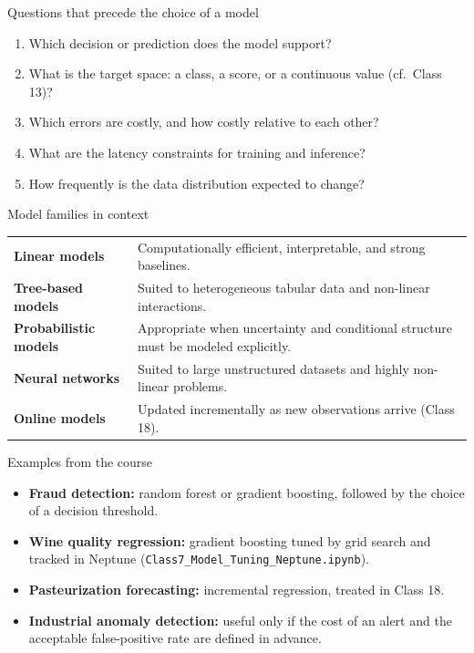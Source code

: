 \begin{frame}{Questions that precede the choice of a model}
\begin{enumerate}
\item Which decision or prediction does the model support?
\item What is the target space: a class, a score, or a continuous value (cf.\ Class 13)?
\item Which errors are costly, and how costly relative to each other?
\item What are the latency constraints for training and inference?
\item How frequently is the data distribution expected to change?
\end{enumerate}
\coursefooter
\end{frame}

\begin{frame}{Model families in context}
\begin{tabularx}{\textwidth}{>{\bfseries}l X}
Linear models & Computationally efficient, interpretable, and strong baselines. \\
\addlinespace[0.3em]
Tree-based models & Suited to heterogeneous tabular data and non-linear interactions. \\
\addlinespace[0.3em]
Probabilistic models & Appropriate when uncertainty and conditional structure must be modeled explicitly. \\
\addlinespace[0.3em]
Neural networks & Suited to large unstructured datasets and highly non-linear problems. \\
\addlinespace[0.3em]
Online models & Updated incrementally as new observations arrive (Class 18). \\
\bottomrule
\end{tabularx}
\coursefooter
\end{frame}

\begin{frame}{Examples from the course}
\begin{itemize}
\item \textbf{Fraud detection:} random forest or gradient boosting, followed by the choice of a decision threshold.
\item \textbf{Wine quality regression:} gradient boosting tuned by grid search and tracked in Neptune (\texttt{Class7\_Model\_Tuning\_Neptune.ipynb}).
\item \textbf{Pasteurization forecasting:} incremental regression, treated in Class 18.
\item \textbf{Industrial anomaly detection:} useful only if the cost of an alert and the acceptable false-positive rate are defined in advance.
\end{itemize}
\coursefooter
\end{frame}

